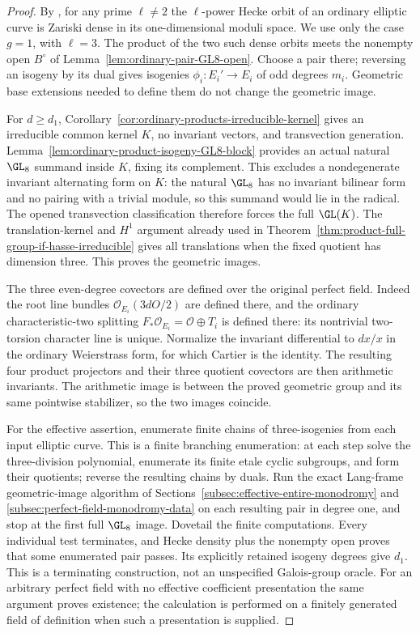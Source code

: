 \begin{proof}
By \cite[Theorem~2, printed p.~477]{Chai1995}, for any prime
$\ell\ne2$ the $\ell$-power Hecke orbit of an ordinary elliptic
curve is Zariski dense in its one-dimensional moduli space.
We use only the case $g=1$, with $\ell=3$.
The product of the two such dense orbits meets the nonempty
open $B^\circ$ of Lemma~\ref{lem:ordinary-pair-GL8-open}.
Choose a pair there; reversing an isogeny by its dual gives
isogenies $\phi_i:E_i'\to E_i$ of odd degrees $m_i$.
Geometric base extensions needed to define them do not change
the geometric image.

For $d\ge d_1$, Corollary~\ref{cor:ordinary-products-irreducible-kernel}
gives an irreducible common kernel $K$, no invariant vectors,
and transvection generation.
Lemma~\ref{lem:ordinary-product-isogeny-GL8-block} provides an
actual natural $\GL_8$ summand inside $K$, fixing its complement.
This excludes a nondegenerate invariant alternating form on
$K$: the natural $\GL_8$ has no invariant bilinear form and
no pairing with a trivial module, so this summand would lie
in the radical. The opened transvection classification
\cite[Theorem~3.6, printed p.~22]{KantorSeress2001} therefore
forces the full $\GL(K)$.
The translation-kernel and $H^1$ argument already used in
Theorem~\ref{thm:product-full-group-if-hasse-irreducible} gives
all translations when the fixed quotient has dimension three.
This proves the geometric images.

The three even-degree covectors are defined over the original
perfect field. Indeed the root line bundles
$\mathcal O_{E_i}(3dO/2)$ are defined there, and the ordinary
characteristic-two splitting $F_*\mathcal O_{E_i}=\mathcal O\oplus T_i$
is defined there: its nontrivial two-torsion character line is
unique. Normalize the invariant differential to $dx/x$ in the
ordinary Weierstrass form, for which Cartier is the identity.
The resulting four product projectors and their three quotient
covectors are then arithmetic invariants. The arithmetic image
is between the proved geometric group and its same pointwise
stabilizer, so the two images coincide.

For the effective assertion, enumerate finite chains of
three-isogenies from each input elliptic curve. This is a finite
branching enumeration: at each step solve the three-division
polynomial, enumerate its finite etale cyclic subgroups, and
form their quotients; reverse the resulting chains by duals.
Run the exact Lang-frame geometric-image algorithm of
Sections~\ref{subsec:effective-entire-monodromy} and
\ref{subsec:perfect-field-monodromy-data} on each resulting pair
in degree one, and stop at the first full $\GL_8$ image.
Dovetail the finite computations. Every individual test
terminates, and Hecke density plus the nonempty open proves
that some enumerated pair passes. Its explicitly retained
isogeny degrees give $d_1$. This is a terminating construction,
not an unspecified Galois-group oracle. For an arbitrary
perfect field with no effective coefficient presentation the
same argument proves existence; the calculation is performed
on a finitely generated field of definition when such a
presentation is supplied.
\end{proof}


